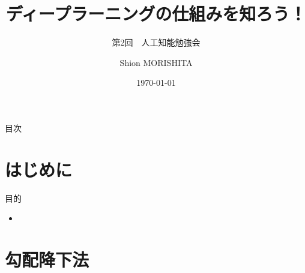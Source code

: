 \documentclass[dvipdfmx,aspectratio=169]{beamer}
\title{ディープラーニングの仕組みを知ろう！}
\subtitle{第2回　人工知能勉強会}
\author{Shion MORISHITA}
\institute{}
\date{\today}
\begin{document}
	\begin{frame}[plain]
	    \maketitle
	\end{frame}
		
	\begin{frame}[shrink]{目次}
		\vspace{1em}
		\tableofcontents
	\end{frame}
	
	\section{はじめに}
	\begin{frame}{目的}
		\begin{itemize}
			\item
		\end{itemize}
	\end{frame}

	\section{勾配降下法}
\end{document}
